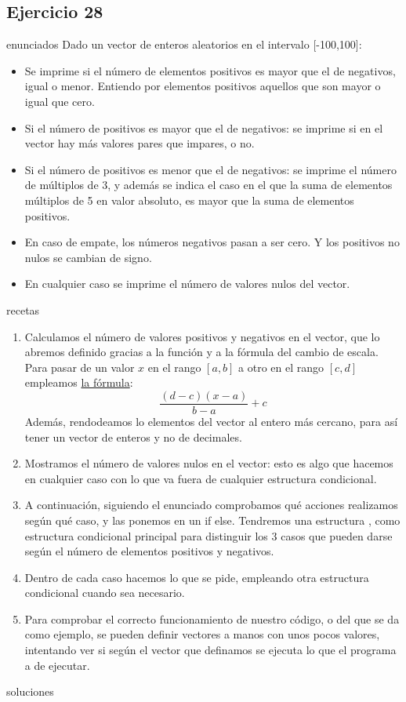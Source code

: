 \subsection{Ejercicio 28}
\def\parte{enunciados}
\ifx\capitulo\parte
Dado un vector de enteros aleatorios en el intervalo [-100,100]:

\begin{itemize}
\item Se imprime si el número de elementos positivos es mayor que el de negativos, igual o menor. Entiendo por elementos positivos aquellos que son mayor o igual que cero.
\item Si el número de positivos es mayor que el de negativos: se imprime si en el vector hay más valores pares que impares, o no.
\item Si el número de positivos es menor que el de negativos: se imprime el número de múltiplos de 3, y además se indica el caso en el que la suma de elementos múltiplos de 5 en valor absoluto, es mayor que la suma de elementos positivos.
\item En caso de empate, los números negativos pasan a ser cero. Y los positivos no nulos se cambian de signo.
\item En cualquier caso se imprime el número de valores nulos del vector.
\end{itemize}
\fi

\def\parte{recetas}
\ifx\capitulo\parte
\begin{enumerate}
\item Calculamos el número de valores positivos y negativos en el vector, que lo abremos definido gracias a la función  y a la fórmula del cambio de escala. Para pasar de un valor $x$ en el rango $[a,b]$ a otro en el rango $[c,d]$ empleamos \href{https://math.stackexchange.com/a/159271}{la fórmula}:
  \[\frac{(d-c)(x-a)}{b-a} + c \]
  Además, rendodeamos lo elementos del vector al entero más cercano, para así tener un vector de enteros y no de decimales.
\item Mostramos el número de valores nulos en el vector: esto es algo que hacemos en cualquier caso con lo que va fuera de cualquier estructura condicional.
\item A continuación, siguiendo el enunciado comprobamos qué acciones realizamos según qué caso, y las ponemos en un if else. Tendremos una estructura , como estructura condicional principal para distinguir los 3 casos que pueden darse según el número de elementos positivos y negativos.
\item Dentro de cada caso hacemos lo que se pide, empleando otra estructura condicional cuando sea necesario.
\item Para comprobar el correcto funcionamiento de nuestro código, o del que se da como ejemplo, se pueden definir vectores a manos con unos pocos valores, intentando ver si según el vector que definamos se ejecuta lo que el programa a de ejecutar.
\end{enumerate}
\fi

\def\parte{soluciones}
\ifx\capitulo\parte

\fi
